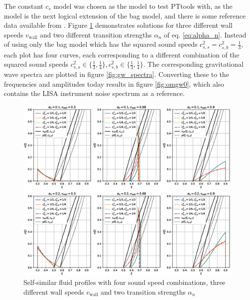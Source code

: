 The constant $c_s$ model was chosen as the model to test PTtools with,
as the model is the next logical extension of the bag model,
and there is some reference data available from \cites{giese_2020}{giese_2021}.
Figure \ref{fig:fluid_profiles} demonstrates solutions for three different wall speeds $v_\text{wall}$ and two different transition strengths $\alpha_n$ of eq. \eqref{eq:alpha_n}.
Instead of using only the bag model which has the squared sound speeds $c_{s,s}^2 = c_{s,b}^2 = \frac{1}{3}$,
each plot has four curves, each corresponding to a different combination of the squared sound speeds
$c_{s,s}^2 \in \{ \frac{1}{3}, \frac{1}{4} \}, c_{s,b}^2 \in \{ \frac{1}{3}, \frac{1}{4} \}$.
The corresponding gravitational wave spectra are plotted in figure \ref{fig:gw_spectra}.
Converting these to the frequencies and amplitudes today results in figure \ref{fig:omgw0},
which also contains the LISA instrument noise spectrum as a reference.

\begin{figure}[ht!]
\centering
\includegraphics[width=\textwidth]{msc2-python/fig/const_cs_gw_v.eps}
\caption{Self-similar fluid profiles with four sound speed combinations, three different wall speeds $v_\text{wall}$ and two transition strengths $\alpha_n$}
\label{fig:fluid_profiles}
\end{figure}

